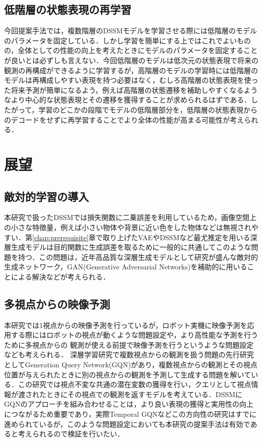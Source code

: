 \subsection{低階層の状態表現の再学習}
今回提案手法では，複数階層のDSSMモデルを学習させる際には低階層のモデルのパラメータを固定している．しかし学習を簡単にする上ではこれでよいものの，全体としての性能の向上を考えたときにモデルのパラメータを固定することが良いとは必ずしも言えない．今回低階層のモデルは低次元の状態表現で将来の観測の再構成ができるように学習するが，高階層のモデルの学習時には低階層のモデルは再構成しやすい表現を持つ必要はなく，むしろ高階層の状態表現を使った将来予測が簡単になるよう，例えば高階層の状態遷移を補助しやすくなるようなより中心的な状態表現とその遷移を獲得することが求められるはずである．したがって，学習のどこかの段階でモデルの低階層部分を，低階層の状態表現からのデコードをせずに再学習することでより全体の性能が高まる可能性が考えられる．

\section{展望}
\subsection{敵対的学習の導入}
本研究で扱ったDSSMでは損失関数に二乗誤差を利用しているため，画像空間上の小さな特徴量，例えば小さい物体や背景に近い色をした物体などは無視されやすい．第\ref{chap:prerequisite}章で取り上げたVAEやDSSMなど最尤推定を用いる深層生成モデルは目的関数に生成誤差を取るために一般的に共通してこのような問題を持つ．この問題は，近年高品質な深層生成モデルとして研究が盛んな敵対的生成ネットワーク，GAN(Generative Adversarial Networks)\cite{goodfellow2014generative}を補助的に用いることによる解決などが考えられる．

\subsection{多視点からの映像予測}
本研究では1視点からの映像予測を行っているが，ロボット実機に映像予測を応用する際にはロボットの視点が動くような問題設定や，より高性能な予測を行うために多視点からの
観測が使える前提で映像予測を行うというような問題設定なども考えられる．
深層学習研究で複数視点からの観測を扱う問題の先行研究としてGeneration Query Network(GQN)\cite{eslami2018neural}があり，複数視点からの観測とその視点位置が与えられたときに別の視点からの観測を予測して生成する問題を解いている．この研究では視点不変な共通の潜在変数の獲得を行い，クエリとして視点情報が渡されたときにその視点での観測を返すモデルを考えている．DSSMにGQNのアプローチを組み合わせることは，より良い表現の獲得と実用性の向上につながるため重要であり，実際Temporal GQN\cite{singh2019sequential}などこの方向性の研究はすでに進められているが，このような問題設定においても本研究の提案手法は有効であると考えられるので検証を行いたい．

